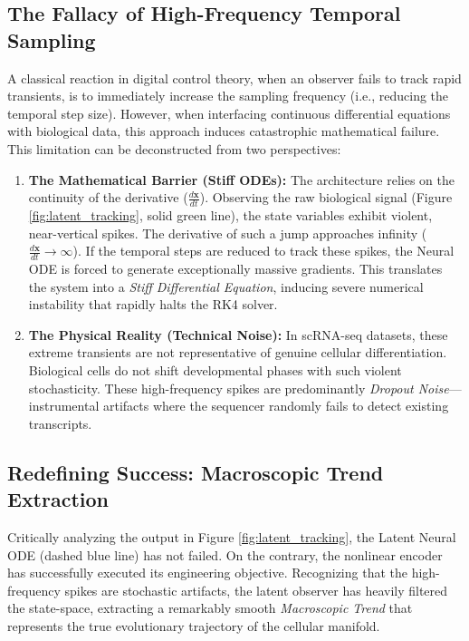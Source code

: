 \documentclass[12pt, a4paper]{article}
\begin{document}
	\subsection{The Fallacy of High-Frequency Temporal Sampling}
	A classical reaction in digital control theory, when an observer fails to track rapid transients, is to immediately increase the sampling frequency (i.e., reducing the temporal step size). However, when interfacing continuous differential equations with biological data, this approach induces catastrophic mathematical failure. This limitation can be deconstructed from two perspectives:
	
	\begin{enumerate}
		\item \textbf{The Mathematical Barrier (Stiff ODEs):} The architecture relies on the continuity of the derivative ($\frac{d\mathbf{x}}{dt}$). Observing the raw biological signal (Figure \ref{fig:latent_tracking}, solid green line), the state variables exhibit violent, near-vertical spikes. The derivative of such a jump approaches infinity ($\frac{d\mathbf{x}}{dt} \to \infty$). If the temporal steps are reduced to track these spikes, the Neural ODE is forced to generate exceptionally massive gradients. This translates the system into a \textit{Stiff Differential Equation}, inducing severe numerical instability that rapidly halts the RK4 solver.
		\item \textbf{The Physical Reality (Technical Noise):} In scRNA-seq datasets, these extreme transients are not representative of genuine cellular differentiation. Biological cells do not shift developmental phases with such violent stochasticity. These high-frequency spikes are predominantly \textit{Dropout Noise}—instrumental artifacts where the sequencer randomly fails to detect existing transcripts.
	\end{enumerate}
	
	\subsection{Redefining Success: Macroscopic Trend Extraction}
	Critically analyzing the output in Figure \ref{fig:latent_tracking}, the Latent Neural ODE (dashed blue line) has not failed. On the contrary, the nonlinear encoder has successfully executed its engineering objective. Recognizing that the high-frequency spikes are stochastic artifacts, the latent observer has heavily filtered the state-space, extracting a remarkably smooth \textit{Macroscopic Trend} that represents the true evolutionary trajectory of the cellular manifold.
	
\end{document}
